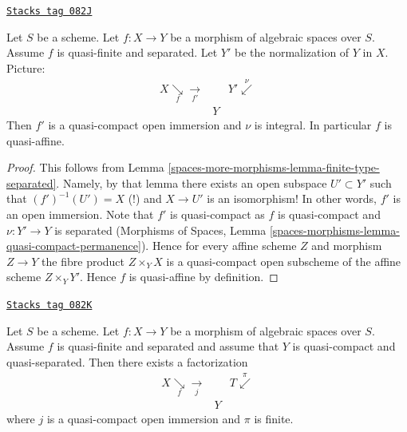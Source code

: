 \begin{lemma}
\label{spaces-more-morphisms-lemma-quasi-finite-separated-quasi-affine}
\href{https://stacks.math.columbia.edu/tag/082J}{\texttt{Stacks tag 082J}}

Let $S$ be a scheme.
Let $f : X \to Y$ be a morphism of algebraic spaces over $S$.
Assume $f$ is quasi-finite and separated.
Let $Y'$ be the normalization of $Y$ in $X$.
Picture:
$$
\begin{array}{ccc}X \underset{f}{\searrow}\underset{f'}{\longrightarrow} &  & Y' \overset{\nu}{\swarrow} \\  & Y & \end{array}
$$
Then $f'$ is a quasi-compact open immersion and $\nu$ is integral.
In particular $f$ is quasi-affine.
\end{lemma}

\begin{proof}
This follows from Lemma \ref{spaces-more-morphisms-lemma-finite-type-separated}. Namely, by
that lemma there exists an open subspace $U' \subset Y'$ such that
$(f')^{-1}(U') = X$ (!) and $X \to U'$ is an isomorphism! In other
words, $f'$ is an open immersion. Note that $f'$ is quasi-compact as
$f$ is quasi-compact and $\nu : Y' \to Y$ is separated
(Morphisms of Spaces, Lemma
\ref{spaces-morphisms-lemma-quasi-compact-permanence}).
Hence for every affine scheme $Z$ and morphism $Z \to Y$ the
fibre product $Z \times_Y X$ is a quasi-compact open subscheme
of the affine scheme $Z \times_Y Y'$. Hence $f$ is quasi-affine by
definition.
\end{proof}

\begin{lemma}

\label{spaces-more-morphisms-lemma-quasi-finite-separated-pass-through-finite}
\href{https://stacks.math.columbia.edu/tag/082K}{\texttt{Stacks tag 082K}}

Let $S$ be a scheme.
Let $f : X \to Y$ be a morphism of algebraic spaces over $S$.
Assume $f$ is quasi-finite and separated and assume that
$Y$ is quasi-compact and quasi-separated. Then there exists
a factorization
$$
\begin{array}{ccc}X \underset{f}{\searrow}\underset{j}{\longrightarrow} &  & T \overset{\pi}{\swarrow} \\  & Y & \end{array}
$$
where $j$ is a quasi-compact open immersion and $\pi$ is finite.
\end{lemma}

